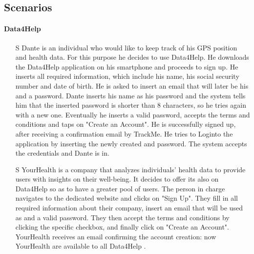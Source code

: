 \documentclass[../../../rasd.tex]{subfiles}
\begin{document}
\subsection{Scenarios}
        \paragraph{Data4Help}
        \begin{itemize}

                    \item[S\subs{1}] Dante is an individual who would like to keep track of his GPS position and health data. For this purpose he decides to use Data4Help. He downloads the Data4Help application on his smartphone and proceeds to sign up. He inserts all required information, which include his name, his social security number and date of birth. He is asked to insert an email that will later be his  and a password. Dante inserts his name as his password and the system tells him that the inserted password is shorter than 8 characters, so he tries again with a new one. Eventually he inserts a valid password, accepts the terms and conditions and taps on "Create an Account". He is successfully signed up, after receiving a confirmation email by TrackMe. He tries to Loginto the application by inserting the newly created  and password. The system accepts the credentials and Dante is in.
                    
                    \item[S\subs{2}] YourHealth is a company that analyzes individuals' health data to provide users with insights on their well-being. It decides to offer its  also on Data4Help so as to have a greater pool of users. The person in charge navigates to the  dedicated website and clicks on "Sign Up". They fill in all required information about their company, insert an email that will be used as  and a valid password. They then accept the terms and conditions by clicking the specific checkbox, and finally click on "Create an Account". YourHealth receives an email confirming the account creation: now YourHealth  are available to all Data4Help .
                    

\end{itemize}
\end{document}
